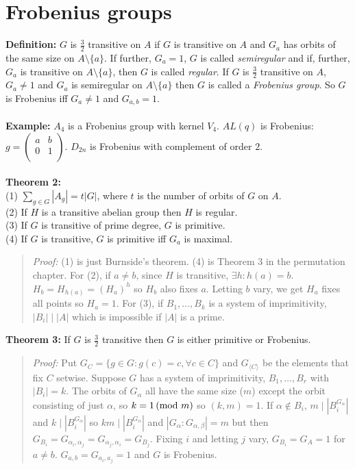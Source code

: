 \section {Frobenius groups}
{\bf Definition:}  
$G$ is ${\frac 3 2}$ transitive on $A$ if $G$ is transitive on $A$ and $G_a$ has orbits of
the same size on $A \setminus \{a\}$. 
If further, $G_a = 1$, $G$ is called \emph{semiregular} and if, further, $G_a$ is transitive on $A \setminus \{a\}$,
then $G$ is called \emph{regular}.  If $G$ is ${\frac 3 2}$ transitive on $A$, $G_a \ne 1$ and $G_a$ is
semiregular on $A \setminus \{a\}$ then $G$ is called a \emph{Frobenius group}.  So $G$ is Frobenius iff
$G_a \ne 1$ and $G_{a,b} = 1$.
\\
\\
{\bf Example:} $A_4$ is a Frobenius group with kernel $V_4$. $AL(q)$ is Frobenius:
$g = 
\left(
\begin{array}{cc}
a &  b \\
0 &  1 \\
\end{array}
\right)$.
$D_{2n}$ is Frobenius with complement of order $2$.
\\
\\
{\bf Theorem 2:} \\
(1) $\sum_{g \in G} |A_g| = t |G|$, where $t$  is the number of orbits of $G$ on $A$.
\\
(2) If $H$ is a transitive abelian group then $H$ is regular.
\\
(3) If $G$ is transitive of prime degree, $G$ is primitive.
\\
(4) If $G$ is transitive, $G$ is primitive iff $G_a$ is maximal.
\begin{quote}
\emph{Proof:}
(1) is just Burnside's theorem. (4) is Theorem 3 in the permutation chapter.
For (2), if $a \ne b$, since $H$ is transitive, $\exists h: h(a) = b$.
$H_b = H_{h(a)} = (H_a)^h$ so $H_b$ also fixes $a$.  Letting $b$ vary, we get $H_a$ fixes all points so
$H_a = 1$.  For (3), if $B_1, \ldots, B_k$ is a system of imprimitivity, $|B_i| \mid |A|$ which is impossible if
$|A|$ is a prime.
\end{quote}
{\bf Theorem 3:} If $G$ is ${\frac 3 2}$ transitive then $G$ is either primitive or Frobenius.
\begin{quote}
\emph{Proof:}
Put $G_C = \{ g \in G: g(c)=c, \forall c \in C \}$ and $G_{\langle C \rangle}$ be the elements that fix $C$ setwise.
Suppose $G$ has a system of imprimitivity, $B_1, \ldots, B_r$ with $|B_i|=k$.  The orbits of $G_{\alpha}$ all have the same size
($m$) except the orbit consisting of just $\alpha$, so $k = 1 \thinspace \textnormal{(mod } m \textnormal{)}$ so $(k,m)=1$.  If $\alpha \notin B_i$,
$m \mid |B_i^{G_{\alpha}}|$ and $k \mid |B_i^{G_{\alpha}}|$ so $km \mid |B_i^{G_{\alpha}}|$ and $|G_{\alpha} : G_{\alpha, \beta}| = m$
but then $G_{B_i} = G_{\alpha_i, \alpha_j} = G_{\alpha_j, \alpha_i} = G_{B_j}$.  Fixing $i$ and letting $j$ vary, $G_{B_i}= G_A = 1$
for $a \ne b$.  $G_{a,b} = G_{a_i, a_j} = 1$ and $G$ is Frobenius.
\end{quote}
